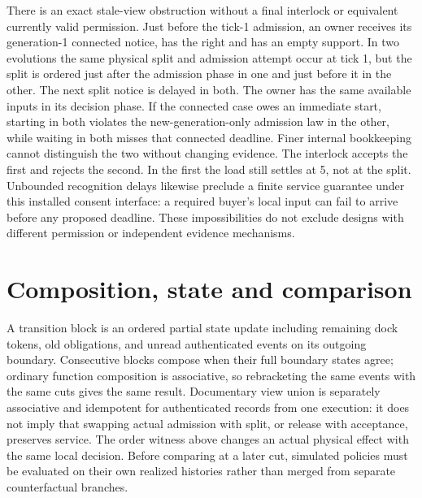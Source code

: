 \documentclass[11pt]{article}
\begin{document}
There is an exact stale-view obstruction without a final interlock or equivalent currently valid permission. Just before the tick-1 admission, an owner receives its generation-1 connected notice, has the right and has an empty support. In two evolutions the same physical split and admission attempt occur at tick 1, but the split is ordered just after the admission phase in one and just before it in the other. The next split notice is delayed in both. The owner has the same available inputs in its decision phase. If the connected case owes an immediate start, starting in both violates the new-generation-only admission law in the other, while waiting in both misses that connected deadline. Finer internal bookkeeping cannot distinguish the two without changing evidence. The interlock accepts the first and rejects the second. In the first the load still settles at 5, not at the split. Unbounded recognition delays likewise preclude a finite service guarantee under this installed consent interface: a required buyer's local input can fail to arrive before any proposed deadline. These impossibilities do not exclude designs with different permission or independent evidence mechanisms.

\section{Composition, state and comparison}
A transition block is an ordered partial state update including remaining dock tokens, old obligations, and unread authenticated events on its outgoing boundary. Consecutive blocks compose when their full boundary states agree; ordinary function composition is associative, so rebracketing the same events with the same cuts gives the same result. Documentary view union is separately associative and idempotent for authenticated records from one execution: it does not imply that swapping actual admission with split, or release with acceptance, preserves service. The order witness above changes an actual physical effect with the same local decision. Before comparing at a later cut, simulated policies must be evaluated on their own realized histories rather than merged from separate counterfactual branches.
\end{document}
